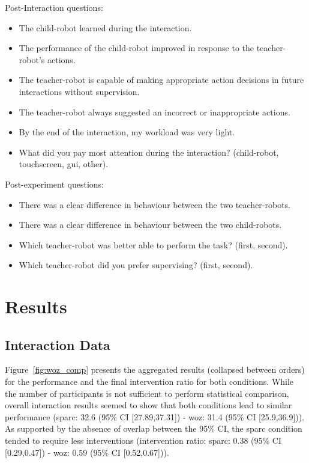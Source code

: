 Post-Interaction questions:
\begin{itemize}
	\item The child-robot learned during the interaction.
	\item The performance of the child-robot improved in response to the teacher-robot's actions.
	\item The teacher-robot is capable of making appropriate action decisions in future interactions without supervision.
	\item The teacher-robot always suggested an incorrect or inappropriate actions.
	\item By the end of the interaction, my workload was very light.
	\item What did you pay most attention during the interaction? (child-robot, touchscreen, \gls{gui}, other).
\end{itemize}

Post-experiment questions:
\begin{itemize}
	\item There was a clear difference in behaviour between the two teacher-robots.
	\item There was a clear difference in behaviour between the two child-robots.
	\item Which teacher-robot was better able to perform the task? (first, second).
	\item Which teacher-robot did you prefer supervising? (first, second).
\end{itemize}

\section{Results}

\subsection{Interaction Data}

Figure~\ref{fig:woz_comp} presents the aggregated results (collapsed between orders) for the performance and the final intervention ratio for both conditions. While the number of participants is not sufficient to perform statistical comparison, overall interaction results seemed to show that both conditions lead to similar performance (\gls{sparc}: 32.6 (95\% CI [27.89,37.31]) - \gls{woz}: 31.4 (95\% CI [25.9,36.9])). As supported by the absence of overlap between the 95\% CI, the \gls{sparc} condition tended to require less interventions (intervention ratio: \gls{sparc}: 0.38 (95\% CI [0.29,0.47]) - \gls{woz}: 0.59 (95\% CI [0.52,0.67])). 

